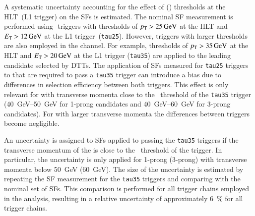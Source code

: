A systematic uncertainty accounting for the effect of \tauhadvis \pT (\ET)
thresholds at the HLT~(L1 trigger) on the \faketauhadvis SFs is estimated. The
nominal SF measurement is performed using \tauhadvis-triggers with thresholds of
$p_{\text{T}} > \SI{25}{\ensuremath{\text{GeV}}}$ at the HLT and $\ET > \SI{12}{\GeV}$ at the L1
trigger~(\texttt{tau25}). However, triggers with larger thresholds are also
employed in the \hadhad channel. For example, thresholds of
$p_{\text{T}} > \SI{35}{\ensuremath{\text{GeV}}}$ at the HLT and $\ET > \SI{20}{\GeV}$ at the L1 trigger
(\texttt{tau35}) are applied to the leading \tauhadvis candidate selected by
DTTs. The application of SFs measured for \texttt{tau25} triggers to
\faketauhadvis that are required to pass a \texttt{tau35} trigger can introduce
a bias due to differences in selection efficiency between both triggers. This
effect is only relevant for \faketauhadvis with transverse momenta close to the
\pT~threshold of the \texttt{tau35} trigger
(\SIrange[range-phrase=--]{40}{50}{\GeV} for 1-prong candidates and
\SIrange[range-phrase=--]{40}{60}{\GeV} for 3-prong candidates). For
\faketauhadvis with larger transverse momenta the differences between triggers
become negligible.


An uncertainty is assigned to SFs applied to \faketauhadvis passing the
\texttt{tau35} triggers if the transverse momentum of the \faketauhadvis is
close to the \pT~threshold of the trigger. In particular, the uncertainty is
only applied for 1-prong (3-prong) \faketauhadvis with transverse momenta below
\SI{50}{\GeV} (\SI{60}{\GeV}). The size of the uncertainty is estimated by
repeating the SF measurement for the \texttt{tau35} triggers and comparing with
the nominal set of SFs. This comparison is performed for all trigger chains
employed in the analysis, resulting in a relative uncertainty of approximately
\SI{6}{\percent} for all trigger chains.

